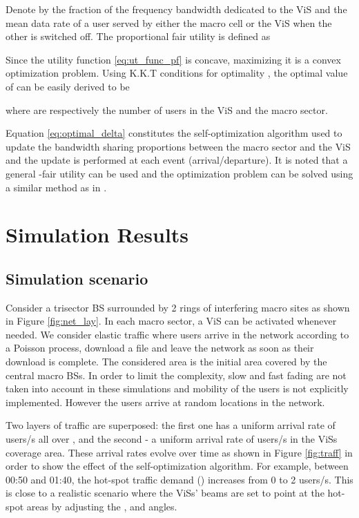 \documentclass[conference]{IEEEtran}
\begin{document}
	Denote by  the fraction of the frequency bandwidth dedicated to the \ac{ViS} and  the mean data rate of a user served by either the macro cell or the \ac{ViS} when the other is switched off. The proportional fair utility is defined as
	

	Since the utility function \eqref{eq:ut_func_pf} is concave, maximizing it is a convex optimization problem. Using \ac{K.K.T} conditions for optimality \cite{boyd_convexoptimization_2004}, the optimal value of  can be easily derived to be
	
	where  are respectively the number of users in the \ac{ViS} and the macro sector.

	Equation \eqref{eq:optimal_delta} constitutes the self-optimization algorithm used to update the bandwidth sharing proportions between the macro sector and the \ac{ViS} and the update is performed at each event (arrival/departure). It is noted that a general -fair utility \cite{altman_generalizedalphafair_2008} can be used and the optimization problem can be solved using a similar method as in \cite{tall_selfoptimizingstrategies_2015}.

\section{Simulation Results} \label{sec:perf_results}
\subsection{Simulation scenario}
	Consider a trisector \ac{BS} surrounded by 2 rings of interfering macro sites as shown in Figure \ref{fig:net_lay}. In each macro sector, a \ac{ViS} can be activated whenever needed. We consider elastic traffic where users arrive in the network according to a Poisson process, download a file and leave the network as soon as their download is complete. The considered area  is the initial area covered by the central macro \acp{BS}. In order to limit the complexity, slow and fast fading are not taken into account in these simulations and mobility of the users is not explicitly implemented. However the users arrive at random locations in the network.

	Two layers of traffic are superposed: the first one has a uniform arrival rate of  users/s all over , and the second - a uniform arrival rate of  users/s in the \acp{ViS} coverage area. These arrival rates evolve over time as shown in Figure \ref{fig:traff} in order to show the effect of the self-optimization algorithm. For example, between 00:50 and 01:40, the hot-spot traffic demand () increases from 0 to 2 users/s. This is close to a realistic scenario where the \acp{ViS}' beams are set to point at the hot-spot areas by adjusting the , and  angles.
\end{document}
